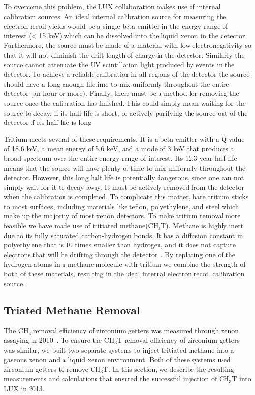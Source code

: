 To overcome this problem, the LUX collaboration makes use of internal calibration sources. An ideal internal calibration source for measuring the electron recoil yields would be a single beta emitter in the energy range of interest (< 15 keV) which can be dissolved into the liquid xenon in the detector. Furthermore, the source must be made of a material with low electronegativity so that it will not diminish the drift length of charge in the detector. Similarly the source cannot attenuate the UV scintillation light produced by events in the detector. To achieve a reliable calibration in all regions of the detector the source should have a long enough lifetime to mix uniformly throughout the entire detector (an hour or more). Finally, there must be a method for removing the source once the calibration has finished. This could simply mean waiting for the source to decay, if its half-life is short, or actively purifying the source out of the detector if its half-life is long

Tritium meets several of these requirements. It is a beta emitter with a Q-value of 18.6 keV, a mean energy of 5.6 keV, and a mode of 3 keV that produces a broad spectrum over the entire energy range of interest. Its 12.3 year half-life means that the source will have plenty of time to mix uniformly throughout the detector. However, this long half life is potentially dangerous, since one can not simply wait for it to decay away. It must be actively removed from the detector when the calibration is completed. To complicate this matter, bare tritium sticks to most surfaces, including materials like teflon, polyethylene, and steel which make up the majority of most xenon detectors. To make tritium removal more feasible we have made use of tritiated methane(CH$_3$T). Methane is highly inert due to its fully saturated carbon-hydrogen bonds. It has a diffusion constant in polyethylene that is 10 times smaller than
hydrogen, and it does not capture electrons that will be drifting through the detector~\cite{TeflonActivationEnergy}. By replacing one of the hydrogen atoms in a methane molecule with tritium we combine the strength of both of these materials, resulting in the ideal internal electron recoil calibration source.

\subsection{Triated Methane Removal} \label{UMDRemoval}

The CH$_4$ removal efficiency of zirconium getters was measured through xenon assaying in 2010~\cite{Dobi:2010ai}. To ensure the CH$_3$T removal efficiency of zirconium getters was similar, we built two separate systems to inject tritiated methane into a gaseous xenon and a liquid xenon environment. Both of these systems used zirconium getters to remove CH$_3$T.  In this section, we describe the resulting measurements and calculations that ensured the successful injection of CH$_3$T into LUX in 2013.

